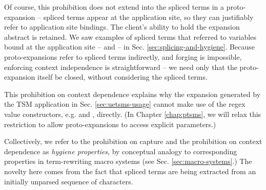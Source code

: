 Of course, this prohibition does not extend into the spliced terms in a proto-expansion -- spliced terms appear at the application site, so they can justifiably refer to application site bindings. The client's ability to hold the expansion abstract is retained. We saw examples of spliced terms that referred to variables bound at the application site  --  and  -- in Sec. \ref{sec:splicing-and-hygiene}. Because proto-expansions refer to spliced terms indirectly, and forging is impossible, enforcing context independence is straightforward -- we need only that the proto-expansion itself be closed, without considering the spliced terms.%

This prohibition on context dependence explains why the expansion generated by the TSM application in Sec. \ref{sec:uetsms-usage} cannot make use of the regex value constructors, e.g.  and , directly. (In Chapter \ref{chap:ptsms}, we will relax this restriction to allow proto-expansions to access explicit parameters.)

Collectively, we refer to the prohibition on capture and the prohibition on context dependence as \emph{hygiene properties}, by conceptual analogy to corresponding properties in term-rewriting macro systems (see Sec. \ref{sec:macro-systems}.) The novelty here comes from the fact that spliced terms are being extracted from an initially unparsed sequence of characters.

